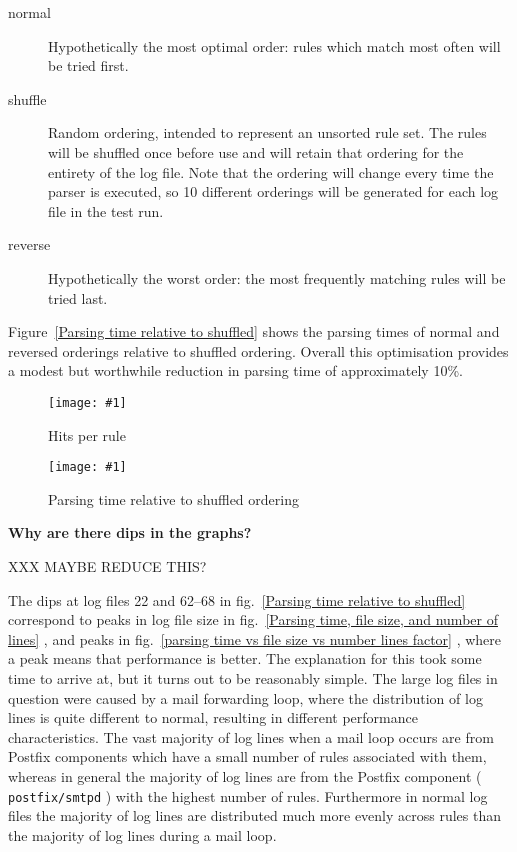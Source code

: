 \documentclass[draft]{svmult}
\newcommand{\showgraph}[3]{%
    \begin{figure}[hbt!]%
        \caption{#2}\label{#3}%
        \texttt{[image: \#1]}%
    \end{figure}%
}
\newcommand{\refwithlabel}[2]{%
    #1~\vref{#2}%
}
\newcommand{\graphref}[1]{%
    \refwithlabel{fig.}{#1}%
}
\newcommand{\Graphref}[1]{%
    \refwithlabel{Figure}{#1}%
}
\newcommand{\daemon}[1]{%
    \texttt{postfix/#1}%
}
\begin{document}
\begin{description}

    \item [normal]  Hypothetically the most optimal order: rules which
        match most often will be tried first.

    \item [shuffle] Random ordering, intended to represent an unsorted rule
        set.  The rules will be shuffled once before use and will retain
        that ordering for the entirety of the log file.  Note that the
        ordering will change every time the parser is executed, so 10
        different orderings will be generated for each log file in the test
        run.

    \item [reverse] Hypothetically the worst order: the most frequently
        matching rules will be tried last.

\end{description}

\Graphref{Parsing time relative to shuffled} shows the parsing times of
normal and reversed orderings relative to shuffled ordering.  Overall this
optimisation provides a modest but worthwhile reduction in parsing time of
approximately 10\%.  \showgraph{build/graph-hits}{Hits per rule}{rule hits
graph} \showgraph{build/graph-optimal-and-reverse-vs-shuffle}{Parsing time
relative to shuffled ordering}{Parsing time relative to shuffled}

\newpage{}

\noindent\textbf{Why are there dips in the graphs?}

XXX MAYBE REDUCE THIS\@?

\label{Why are there dips in the graphs?}

The dips at log files 22 and 62--68 in \graphref{Parsing time relative to
shuffled} correspond to peaks in log file size in \graphref{Parsing time,
file size, and number of lines}, and peaks in \graphref{parsing time vs
file size vs number lines factor}, where a peak means that performance is
better.  The explanation for this took some time to arrive at, but it turns
out to be reasonably simple.  The large log files in question were caused
by a mail forwarding loop, where the distribution of log lines is quite
different to normal, resulting in different performance characteristics.
The vast majority of log lines when a mail loop occurs are from Postfix
components which have a small number of rules associated with them, whereas
in general the majority of log lines are from the Postfix component
(\daemon{smtpd}) with the highest number of rules.  Furthermore in normal
log files the majority of log lines are distributed much more evenly across
rules than the majority of log lines during a mail loop.
\end{document}
